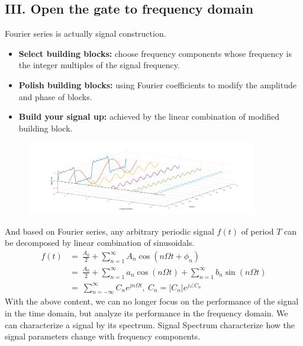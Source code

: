 \documentclass[margin,line]{res}
\begin{document}
\begin{resume}
\section{\sc III. Open the gate to frequency domain}
\hspace{.05in}
Fourier series is actually signal construction.
\begin{itemize}
	\item \textbf{Select building blocks:} choose frequency components whose frequency is the integer multiples of the signal frequency.
	\item \textbf{Polish building blocks:} using Fourier coefficients to modify the amplitude and phase of blocks.
	\item \textbf{Build your signal up:} achieved by the linear combination of modified building block.
\end{itemize}
\begin{figure}[H]
	\begin{minipage}{0.5\linewidth}
		\centerline{}
	\end{minipage}
	\begin{minipage}{0.5\linewidth}
		\centerline{\includegraphics[width=0.9\textwidth]{figure/fig_9.png}}
	\end{minipage}
\end{figure}
And based on Fourier series, any arbitrary periodic signal $f(t)$ of period $T$ can be decomposed by linear combination of sinusoidals.
\begin{align}
f(t)	&= \ \frac{A_0}{2} + \sum\limits_{n=1}^{\infty}{A_n \cos (n \Omega t + \phi_{n})} \nonumber \\
		&= \ \frac{A_0}{2} + \sum\limits_{n=1}^{\infty}{a_n \cos (n \Omega t)} + \sum\limits_{n=1}^{\infty}{b_n \sin (n \Omega t)} \nonumber \\ 
		&= \ \sum\limits_{n=-\infty}^{\infty}{C_n e^{jn\Omega t} } , \ C_n=\left|C_n\right| e^{j\angle C_n} \nonumber
\end{align}
With the above content, we can no longer focus on the performance of the signal in the time domain, but analyze its performance in the frequency domain. We can characterize a signal by its spectrum. Signal Spectrum characterize how the signal parameters change with frequency components.\par 

\end{resume}
\end{document}
